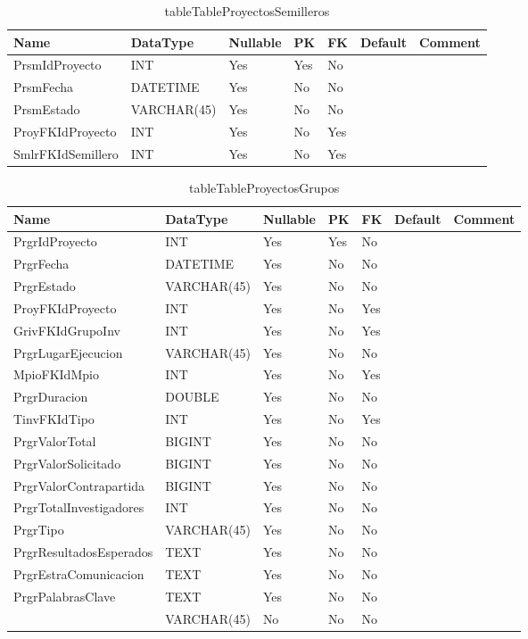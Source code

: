 \begin{table}
	\caption{tableTableProyectosSemilleros}
	\label{labelTableProyectosSemilleros}
	\begin{tabular}{ |l|l|l|l|l|l|l| }
		\hline
		Name & DataType & Nullable & PK & FK & Default & Comment \\ \hline
		PrsmIdProyecto & INT & Yes & Yes & No &  & \\ \hline 
		PrsmFecha & DATETIME & Yes & No & No &  & \\ \hline 
		PrsmEstado & VARCHAR(45) & Yes & No & No &  & \\ \hline 
		ProyFKIdProyecto & INT & Yes & No & Yes &  & \\ \hline 
		SmlrFKIdSemillero & INT & Yes & No & Yes &  & \\ \hline 
		
	\end{tabular}
\end{table}


\begin{table}
	\caption{tableTableProyectosGrupos}
	\label{labelTableProyectosGrupos}
	\begin{tabular}{ |l|l|l|l|l|l|l| }
		\hline
		Name & DataType & Nullable & PK & FK & Default & Comment \\ \hline
		PrgrIdProyecto & INT & Yes & Yes & No &  & \\ \hline 
		PrgrFecha & DATETIME & Yes & No & No &  & \\ \hline 
		PrgrEstado & VARCHAR(45) & Yes & No & No &  & \\ \hline 
		ProyFKIdProyecto & INT & Yes & No & Yes &  & \\ \hline 
		GrivFKIdGrupoInv & INT & Yes & No & Yes &  & \\ \hline 
		PrgrLugarEjecucion & VARCHAR(45) & Yes & No & No &  & \\ \hline 
		MpioFKIdMpio & INT & Yes & No & Yes &  & \\ \hline 
		PrgrDuracion & DOUBLE & Yes & No & No &  & \\ \hline 
		TinvFKIdTipo & INT & Yes & No & Yes &  & \\ \hline 
		PrgrValorTotal & BIGINT & Yes & No & No &  & \\ \hline 
		PrgrValorSolicitado & BIGINT & Yes & No & No &  & \\ \hline 
		PrgrValorContrapartida & BIGINT & Yes & No & No &  & \\ \hline 
		PrgrTotalInvestigadores & INT & Yes & No & No &  & \\ \hline 
		PrgrTipo & VARCHAR(45) & Yes & No & No &  & \\ \hline 
		PrgrResultadosEsperados & TEXT & Yes & No & No &  & \\ \hline 
		PrgrEstraComunicacion & TEXT & Yes & No & No &  & \\ \hline 
		PrgrPalabrasClave & TEXT & Yes & No & No &  & \\ \hline 
		& VARCHAR(45) & No & No & No &  & \\ \hline 
		
	\end{tabular}
\end{table}


